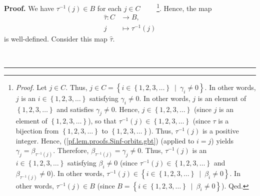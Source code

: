 \documentclass[numbers=enddot,12pt,final,onecolumn,notitlepage]{scrartcl}%
\theoremstyle{definition}
\newenvironment{proof}[1][Proof]{\noindent\textbf{#1.} }{\ \rule{0.5em}{0.5em}}
\newenvironment{verlong}{}{}
\begin{document}
\begin{verlong}
\begin{proof}
We have $\tau^{-1}\left(  j\right)  \in B$ for each $j\in C$%
\ \ \ \ \footnote{\textit{Proof.} Let $j\in C$. Thus, $j\in C=\left\{
i\in\left\{  1,2,3,\ldots\right\}  \ \mid\ \gamma_{i}\neq0\right\}  $. In
other words, $j$ is an $i\in\left\{  1,2,3,\ldots\right\}  $ satisfying
$\gamma_{i}\neq0$. In other words, $j$ is an element of $\left\{
1,2,3,\ldots\right\}  $ and satisfies $\gamma_{j}\neq0$. Hence, $j\in\left\{
1,2,3,\ldots\right\}  $ (since $j$ is an element of $\left\{  1,2,3,\ldots
\right\}  $), so that $\tau^{-1}\left(  j\right)  \in\left\{  1,2,3,\ldots
\right\}  $ (since $\tau$ is a bijection from $\left\{  1,2,3,\ldots\right\}
$ to $\left\{  1,2,3,\ldots\right\}  $). Thus, $\tau^{-1}\left(  j\right)  $
is a positive integer. Hence, (\ref{pf.lem.proofs.Sinf-orbits.gbt}) (applied
to $i=j$) yields $\gamma_{j}=\beta_{\tau^{-1}\left(  j\right)  }$. Therefore,
$\beta_{\tau^{-1}\left(  j\right)  }=\gamma_{j}\neq0$. Thus, $\tau^{-1}\left(
j\right)  $ is an $i\in\left\{  1,2,3,\ldots\right\}  $ satisfying $\beta
_{i}\neq0$ (since $\tau^{-1}\left(  j\right)  \in\left\{  1,2,3,\ldots
\right\}  $ and $\beta_{\tau^{-1}\left(  j\right)  }\neq0$). In other words,
$\tau^{-1}\left(  j\right)  \in\left\{  i\in\left\{  1,2,3,\ldots\right\}
\ \mid\ \beta_{i}\neq0\right\}  $. In other words, $\tau^{-1}\left(  j\right)
\in B$ (since $B=\left\{  i\in\left\{  1,2,3,\ldots\right\}  \ \mid\ \beta
_{i}\neq0\right\}  $). Qed.}. Hence, the map
\begin{align*}
\widehat{\tau}:C  &  \rightarrow B,\\
j  &  \mapsto\tau^{-1}\left(  j\right)
\end{align*}
is well-defined. Consider this map $\widehat{\tau}$.


\end{proof}
\end{verlong}
\end{document}
